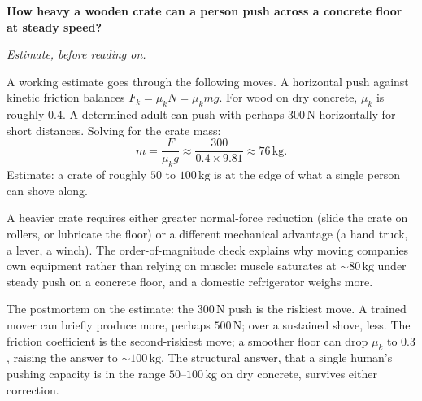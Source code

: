 \begin{estimation}
\textbf{How heavy a wooden crate can a person push across a concrete
floor at steady speed?}

\smallskip
\textit{Estimate, before reading on.}

\smallskip
A working estimate goes through the following moves. A horizontal
push against kinetic friction balances $F_k = \mu_k N = \mu_k m g$.
For wood on dry concrete, $\mu_k$ is roughly $0.4$. A determined adult
can push with perhaps $300\,\text{N}$ horizontally for short
distances. Solving for the crate mass:
\[
m = \frac{F}{\mu_k g} \approx \frac{300}{0.4 \times 9.81}
\approx 76\,\si{\kilogram}.
\]
Estimate: a crate of roughly $50$ to $100\,\si{\kilogram}$ is at the
edge of what a single person can shove along.

A heavier crate requires either greater normal-force reduction (slide
the crate on rollers, or lubricate the floor) or a different
mechanical advantage (a hand truck, a lever, a winch). The
order-of-magnitude check explains why moving companies own equipment
rather than relying on muscle: muscle saturates at $\sim 80\,\si{
\kilogram}$ under steady push on a concrete floor, and a domestic
refrigerator weighs more.

The postmortem on the estimate: the $300\,\text{N}$ push is the
riskiest move. A trained mover can briefly produce more, perhaps
$500\,\text{N}$; over a sustained shove, less. The friction
coefficient is the second-riskiest move; a smoother floor can drop
$\mu_k$ to $0.3$, raising the answer to $\sim 100\,\si{\kilogram}$.
The structural answer, that a single human's pushing capacity is in
the range $50$--$100\,\si{\kilogram}$ on dry concrete, survives
either correction.
\end{estimation}

